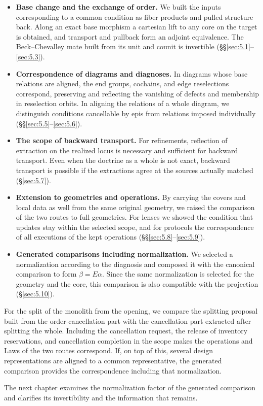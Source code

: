 \begin{itemize}
\item \textbf{Base change and the exchange of order.} We built the inputs corresponding to
a common condition as fiber products and pulled structure back. Along an exact base
morphism a cartesian lift to any core on the target is obtained, and transport and
pullback form an adjoint equivalence. The Beck--Chevalley mate built from its unit and
counit is invertible (\S\S\ref{sec:5.1}--\ref{sec:5.3}).
\item \textbf{Correspondence of diagrams and diagnoses.} In diagrams whose base relations
are aligned, the end groups, cochains, and edge reselections correspond, preserving and
reflecting the vanishing of defects and membership in reselection orbits. In aligning the
relations of a whole diagram, we distinguish conditions cancellable by epis from relations
imposed individually (\S\S\ref{sec:5.5}--\ref{sec:5.6}).
\item \textbf{The scope of backward transport.} For refinements, reflection of extraction
on the realized locus is necessary and sufficient for backward transport. Even when the
doctrine as a whole is not exact, backward transport is possible if the extractions agree
at the sources actually matched (\S\ref{sec:5.7}).
\item \textbf{Extension to geometries and operations.} By carrying the covers and local
data as well from the same original geometry, we raised the comparison of the two routes
to full geometries. For lenses we showed the condition that updates stay within the
selected scope, and for protocols the correspondence of all executions of the kept
operations (\S\S\ref{sec:5.8}--\ref{sec:5.9}).
\item \textbf{Generated comparisons including normalization.} We selected a normalization
according to the diagnosis and composed it with the canonical comparison to form
$\beta=E\alpha$. Since the same normalization is selected for the geometry and the core,
this comparison is also compatible with the projection (\S\ref{sec:5.10}).
\end{itemize}

For the split of the monolith from the opening, we compare the splitting proposal built
from the order-cancellation part with the cancellation part extracted after splitting the
whole. Including the cancellation request, the release of inventory reservations, and
cancellation completion in the scope makes the operations and Laws of the two routes
correspond. If, on top of this, several design representations are aligned to a common
representative, the generated comparison provides the correspondence including that
normalization.

The next chapter examines the normalization factor of the generated comparison and
clarifies its invertibility and the information that remains.
